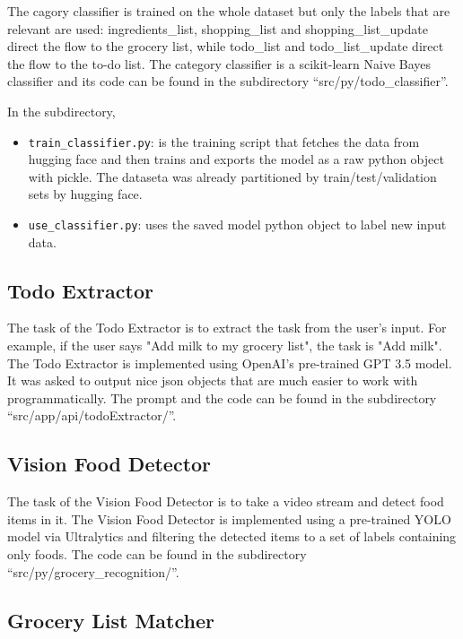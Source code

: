 \documentclass{article}
\begin{document}
The cagory classifier is trained on the whole dataset but only the labels that are relevant are used: ingredients\_list, shopping\_list and shopping\_list\_update direct the flow to the grocery list, while todo\_list and todo\_list\_update direct the flow to the to-do list. The category classifier is a scikit-learn Naive Bayes classifier and its code can be found in the subdirectory ``src/py/todo\_classifier''.


In the subdirectory,
\begin{itemize}
  \item \texttt{train\_classifier.py}: is the training script that fetches the data from hugging face and then trains and exports the model as a raw python object with pickle. The dataseta was already partitioned by train/test/validation sets by hugging face.
  \item \texttt{use\_classifier.py}: uses the saved model python object to label new input data.
\end{itemize}

\subsection*{\color{draculayellow}Todo Extractor}

The task of the Todo Extractor is to extract the task from the user's input. For example, if the user says "Add milk to my grocery list", the task is "Add milk". The Todo Extractor is implemented using OpenAI's pre-trained GPT 3.5 model. It was asked to output nice json objects that are much easier to work with programmatically. The prompt and the code can be found in the subdirectory ``src/app/api/todoExtractor/''.


\subsection*{\color{draculayellow}Vision Food Detector}

The task of the Vision Food Detector is to take a video stream and detect food items in it. The Vision Food Detector is implemented using a pre-trained YOLO model via Ultralytics and filtering the detected items to a set of labels containing only foods. The code can be found in the subdirectory ``src/py/grocery\_recognition/''.

\subsection*{\color{draculayellow}Grocery List Matcher}
\end{document}
